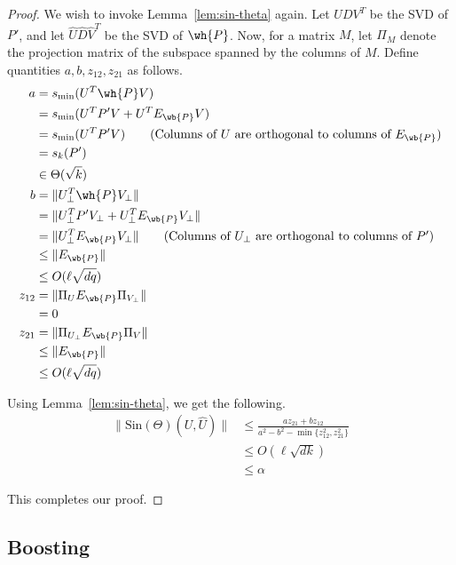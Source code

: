 \begin{proof}
    We wish to invoke Lemma~\ref{lem:sin-theta} again. Let $UDV^T$
    be the SVD of $P'$, and let $\hat{U}\hat{D}\hat{V}^T$ be
    the SVD of $\wh{P}$. Now, for a matrix $M$, let $\Pi_M$ denote
    the projection matrix of the subspace spanned by the columns
    of $M$. Define quantities $a,b,z_{12},z_{21}$ as follows.
    \begin{align*}
        a &= s_{\min}(U^T\wh{P}V)\\
            &= s_{\min}(U^TP'V + U^TE_{\wb{P}}V)\\
            &= s_{\min}(U^TP'V) \tag{Columns of $U$ are orthogonal to columns of $E_{\wb{P}}$}\\
            &= s_k(P')\\
            &\in \Theta(\sqrt{k})\\
        b &= \|U_{\bot}^T\wh{P}V_{\bot}\|\\
            &= \|U_{\bot}^TP'V_{\bot} + U_{\bot}^TE_{\wb{P}}V_{\bot}\|\\
            &= \|U_{\bot}^TE_{\wb{P}}V_{\bot}\|
                \tag{Columns of $U_{\bot}$ are orthogonal to columns of $P'$}\\
            &\leq \|E_{\wb{P}}\|\\
            &\leq O(\ell\sqrt{dq})\\
        z_{12} &= \|\Pi_U E_{\wb{P}} \Pi_{V_{\bot}}\|\\
            &= 0\\
        z_{21} &= \|\Pi_{U_{\bot}}E_{\wb{P}}\Pi_V\|\\
            &\leq \|E_{\wb{P}}\|\\
            &\leq O(\ell{\sqrt{dq}})
    \end{align*}

    Using Lemma~\ref{lem:sin-theta}, we get the following.
    \begin{align*}
        \|\text{Sin}(\Theta)(U,\hat{U})\| &\leq \frac{az_{21} + bz_{12}}
                {a^2-b^2-\min\{z_{12}^2,z_{21}^2\}}\\
            &\leq O\left(\ell\sqrt{dk}\right)\\
            &\leq \alpha
    \end{align*}

    This completes our proof.
\end{proof}

\subsection{Boosting}

